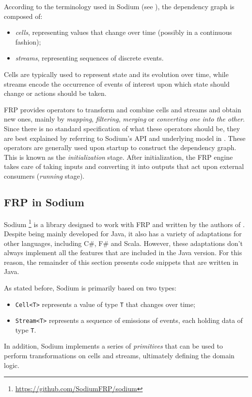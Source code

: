 According to the terminology used in Sodium (see ), the dependency graph is composed of:
%
\begin{itemize}
  \item \textit{cells}, representing values that change over time (possibly in a continuous fashion);
  \item \textit{streams}, representing sequences of discrete events.
\end{itemize}
%
Cells are typically used to represent state and its evolution over time, while streams encode the occurrence of events of interest upon which state should change or actions should be taken.

FRP provides operators to transform and combine cells and streams and obtain new ones, mainly by \textit{mapping}, \textit{filtering}, \textit{merging} or \textit{converting one into the other}.
%
Since there is no standard specification of what these operators should be, they are best explained by referring to Sodium's API and underlying model in .
%
These operators are generally used upon startup to construct the dependency graph.
%
This is known as the \textit{initialization} stage.
%
After initialization, the FRP engine takes care of taking inputs and converting it into outputs that act upon external consumers (\textit{running} stage).

\subsection{FRP in Sodium}
\label{sec:sodium}

Sodium \footnote{\url{https://github.com/SodiumFRP/sodium}} is a library designed to work with FRP and written by the authors of \cite{blackheath2016functional}.
%
Despite being mainly developed for Java, it also has a variety of adaptations for other languages, including C\#, F\# and Scala.
%
However, these adaptations don't always implement all the features that are included in the Java version.
%
For this reason, the remainder of this section presents code snippets that are written in Java.

As stated before, Sodium is primarily based on two types:
%
\begin{itemize}
  \item \texttt{Cell<T>} represents a value of type \texttt{T} that changes over time;
  \item \texttt{Stream<T>} represents a sequence of emissions of events, each holding data of type \texttt{T}.
\end{itemize}
%
In addition, Sodium implements a series of \textit{primitives} that can be used to perform transformations on cells and streams, ultimately defining the domain logic.

